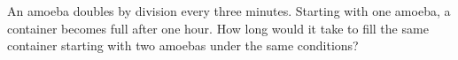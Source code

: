 An amoeba doubles by division every three minutes. Starting with one amoeba, a container becomes full after one hour. How long would it take to fill the same container starting with two amoebas under the same conditions?
